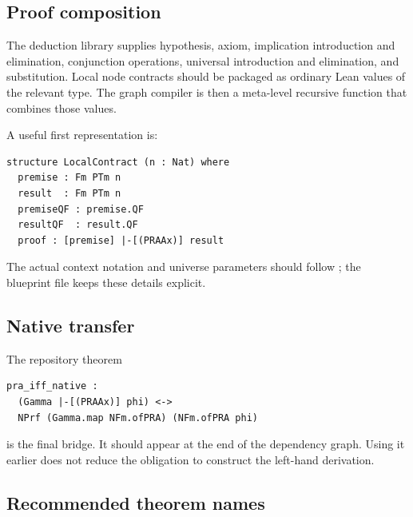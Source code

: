 \subsection{Proof composition}

The deduction library supplies hypothesis, axiom, implication introduction
and elimination, conjunction operations, universal introduction and
elimination, and substitution.  Local node contracts should be packaged as
ordinary Lean values of the relevant  type.  The graph compiler is
then a meta-level recursive function that combines those values.

A useful first representation is:
\begin{lstlisting}[language={}]
structure LocalContract (n : Nat) where
  premise : Fm PTm n
  result  : Fm PTm n
  premiseQF : premise.QF
  resultQF  : result.QF
  proof : [premise] |-[(PRAAx)] result
\end{lstlisting}
The actual context notation and universe parameters should follow
; the blueprint file keeps these details explicit.

\subsection{Native transfer}

The repository theorem
\begin{lstlisting}[language={}]
pra_iff_native :
  (Gamma |-[(PRAAx)] phi) <->
  NPrf (Gamma.map NFm.ofPRA) (NFm.ofPRA phi)
\end{lstlisting}
is the final bridge.  It should appear at the end of the dependency graph.
Using it earlier does not reduce the obligation to construct the left-hand
derivation.

\subsection{Recommended theorem names}

